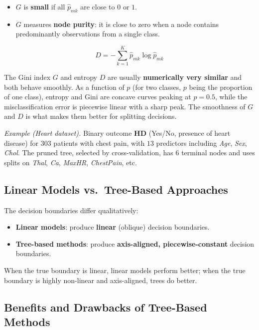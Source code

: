 \documentclass[11pt,a4paper]{article}
\theoremstyle{definition}
\theoremstyle{plain}
\theoremstyle{remark}
\begin{document}
\begin{itemize}
    \item $G$ is \textbf{small} if all $\hat{p}_{mk}$ are close to $0$ or $1$.
    \item $G$ measures \textbf{node purity}: it is close to zero when a node contains predominantly observations from a single class.
\end{itemize}

\begin{tcolorbox}[colback=blue!5!white,colframe=blue!75!black,title=\textbf{Entropy}]
\[
    D = -\sum_{k=1}^{K} \hat{p}_{mk} \log \hat{p}_{mk}
\]
\end{tcolorbox}

The Gini index $G$ and entropy $D$ are usually \textbf{numerically very similar} and both behave smoothly. As a function of $p$ (for two classes, $p$ being the proportion of one class), entropy and Gini are concave curves peaking at $p = 0.5$, while the misclassification error is piecewise linear with a sharp peak. The smoothness of $G$ and $D$ is what makes them better for splitting decisions.

\textit{Example (Heart dataset).} Binary outcome \textbf{HD} (Yes/No, presence of heart disease) for $303$ patients with chest pain, with $13$ predictors including \textit{Age}, \textit{Sex}, \textit{Chol}. The pruned tree, selected by cross-validation, has $6$ terminal nodes and uses splits on \textit{Thal}, \textit{Ca}, \textit{MaxHR}, \textit{ChestPain}, etc.

\subsection{Linear Models vs.\ Tree-Based Approaches}

The decision boundaries differ qualitatively:
\begin{itemize}
    \item \textbf{Linear models}: produce \textbf{linear} (oblique) decision boundaries.
    \item \textbf{Tree-based methods}: produce \textbf{axis-aligned, piecewise-constant} decision boundaries.
\end{itemize}
When the true boundary is linear, linear models perform better; when the true boundary is highly non-linear and axis-aligned, trees do better.

\subsection{Benefits and Drawbacks of Tree-Based Methods}
\end{document}
